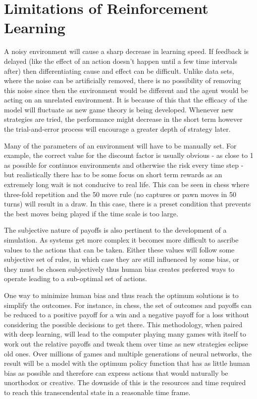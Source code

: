 \documentclass[10pt,a4paper]{report}
\begin{document}
		\section{Limitations of Reinforcement Learning}
			A noisy environment will cause a sharp decrease in learning speed. If feedback is delayed (like the effect of an action doesn't happen until a few time intervals after)
			then differentiating cause and effect can be difficult. Unlike data sets, where the noise can be artificially removed, there is no possibility of removing
			this noise since then the environment would be different and the agent would be acting on an unrelated environment. It is because of this that the efficacy
			of the model will fluctuate as new game theory is being developed. Whenever new strategies are tried, the performance might decrease in the short term however
			the trial-and-error process will encourage a greater depth of strategy later. \par
			Many of the parameters of an environment will have to be manually set. For example, the correct value for the discount factor is
			usually obvious - as close to 1 as possible for continuos environments and otherwise the risk every time step - but realistically there has
			to be some focus on short term rewards as an extremely long wait is not conducive to real life. This can be seen in chess where three-fold repetition
			and the 50 move rule (no captures or pawn moves in 50 turns) will result in a draw. In this case, there is a preset condition that prevents the best moves
			being played if the time scale is too large. \par
			The subjective nature of payoffs is also pertinent to the development of a simulation. As systems get more complex it becomes more difficult to ascribe
			values to the actions that can be taken. Either these values will follow some subjective set of rules, in which case they are still influenced by some bias, or they
			must be chosen subjectively thus human bias creates preferred ways to operate leading to a sub-optimal set of actions. \par
			 One way to minimize human bias and thus
			reach the optimum solutions is to simplify the outcomes. For instance, in chess, the set of outcomes and payoffs can be reduced to a positive payoff for a win and a
			negative payoff for a loss without considering the possible decisions to get there. This methodology, when paired with deep learning, will lead to the computer playing
			many games with itself to work out the relative payoffs and tweak them over time as new strategies eclipse old ones. Over millions of games and multiple generations
			of neural networks, the result will be a model with the optimum policy function that has as little human bias as possible and therefore can express actions that would
			naturally be unorthodox or creative. The downside of this is the resources and time required to reach this transcendental state in a reasonable time frame.
\end{document}
